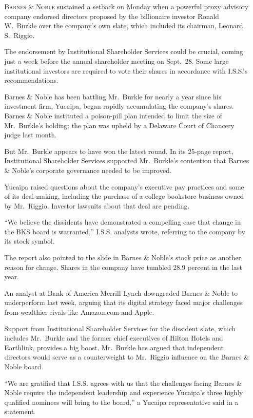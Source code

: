 ﻿\documentclass[12pt]{article}
\begin{document}
\lettrine{B}{arnes \& Noble} sustained a setback on Monday when a powerful
proxy advisory company endorsed directors proposed by the billionaire investor Ronald W.~Burkle over
the company's own slate, which included its chairman, Leonard S.~Riggio.

The endorsement by Institutional Shareholder Services could be crucial, coming just a week before
the annual shareholder meeting on Sept.~28. Some large institutional investors are required to vote
their shares in accordance with I.S.S.'s recommendations.

Barnes \& Noble has been battling Mr.~Burkle for nearly a year since his investment firm, Yucaipa,
began rapidly accumulating the company's shares. Barnes \& Noble instituted a poison-pill plan
intended to limit the size of Mr.~Burkle's holding; the plan was upheld by a Delaware Court of
Chancery judge last month.

But Mr.~Burkle appears to have won the latest round. In its 25-page report, Institutional
Shareholder Services supported Mr.~Burkle's contention that Barnes \& Noble's corporate governance
needed to be improved.

Yucaipa raised questions about the company's executive pay practices and some of its deal-making,
including the purchase of a college bookstore business owned by Mr.~Riggio. Investor lawsuits about
that deal are pending.

``We believe the dissidents have demonstrated a compelling case that change in the BKS board is
warranted,'' I.S.S. analysts wrote, referring to the company by its stock symbol.

The report also pointed to the slide in Barnes \& Noble's stock price as another reason for change.
Shares in the company have tumbled 28.9 percent in the last year.

An analyst at Bank of America Merrill Lynch downgraded Barnes \& Noble to underperform last week,
arguing that its digital strategy faced major challenges from wealthier rivals like Amazon.com and
Apple.

Support from Institutional Shareholder Services for the dissident slate, which includes Mr.~Burkle
and the former chief executives of Hilton Hotels and Earthlink, provides a big boost. Mr.~Burkle has
argued that independent directors would serve as a counterweight to Mr.~Riggio influence on the
Barnes \& Noble board.

``We are gratified that I.S.S. agrees with us that the challenges facing Barnes \& Noble require the
independent leadership and experience Yucaipa's three highly qualified nominees will bring to the
board,'' a Yucaipa representative said in a statement.
\end{document}
